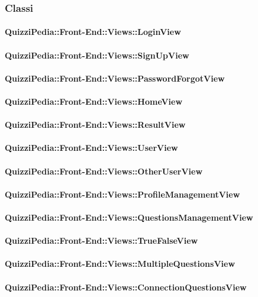 \subsubsection{Classi}
\paragraph{QuizziPedia::Front-End::Views::LoginView}
\paragraph{QuizziPedia::Front-End::Views::SignUpView}
\paragraph{QuizziPedia::Front-End::Views::PasswordForgotView}
\paragraph{QuizziPedia::Front-End::Views::HomeView}
\paragraph{QuizziPedia::Front-End::Views::ResultView}
\paragraph{QuizziPedia::Front-End::Views::UserView}
\paragraph{QuizziPedia::Front-End::Views::OtherUserView}
\paragraph{QuizziPedia::Front-End::Views::ProfileManagementView}
\paragraph{QuizziPedia::Front-End::Views::QuestionsManagementView}
\paragraph{QuizziPedia::Front-End::Views::TrueFalseView}
\paragraph{QuizziPedia::Front-End::Views::MultipleQuestionsView}
\paragraph{QuizziPedia::Front-End::Views::ConnectionQuestionsView}
